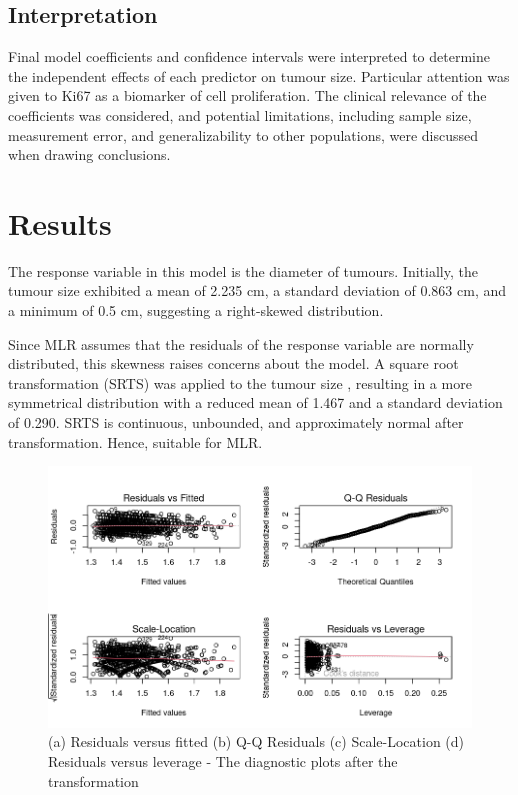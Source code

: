 \documentclass[letter]{article}
\begin{document}
\subsection{Interpretation}

Final model coefficients and confidence intervals were interpreted to determine the independent effects of each predictor on tumour size. Particular attention was given to Ki67 as a biomarker of cell proliferation. 
The clinical relevance of the coefficients was considered, and potential limitations, including sample size, measurement error, and generalizability to other populations, were discussed when drawing conclusions.

\newpage

\section{Results}

The response variable in this model is the diameter of tumours. Initially,
the tumour size exhibited a mean of 2.235 cm, a standard deviation of 0.863 cm, and a minimum
of 0.5 cm, suggesting a right-skewed distribution.

Since MLR assumes that the
residuals of the response variable are normally distributed, this skewness raises concerns about
the model. A square root transformation (SRTS) was applied to the tumour size , resulting in a
more symmetrical distribution with a reduced mean of 1.467 and a standard deviation of 0.290.
SRTS is continuous, unbounded, and approximately normal after transformation.
Hence, suitable for MLR.

\begin{figure}[hbt!]
        \centering
        \includegraphics[width=\textwidth]{sqrt_Diagnostics.png}
        \caption{(a) Residuals versus fitted (b) Q-Q Residuals (c) Scale-Location (d) Residuals versus leverage - The diagnostic plots after the transformation}
\end{figure}
\end{document}
